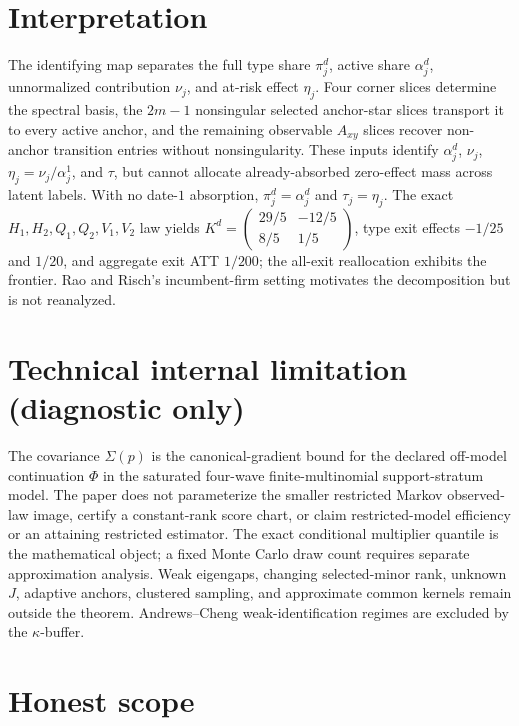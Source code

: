 \documentclass{article}
\begin{document}
\section{Interpretation}

The identifying map separates the full type share \(\pi_j^d\), active share \(\alpha_j^d\), unnormalized contribution \(\nu_j\), and at-risk effect \(\eta_j\).  Four corner slices determine the spectral basis, the \(2m-1\) nonsingular selected anchor-star slices transport it to every active anchor, and the remaining observable \(A_{xy}\) slices recover non-anchor transition entries without nonsingularity.  These inputs identify \(\alpha_j^d\), \(\nu_j\), \(\eta_j=\nu_j/\alpha_j^1\), and \(\tau\), but cannot allocate already-absorbed zero-effect mass across latent labels.  With no date-\(1\) absorption, \(\pi_j^d=\alpha_j^d\) and \(\tau_j=\eta_j\).  The exact \(H_1,H_2,Q_1,Q_2,V_1,V_2\) law yields \(K^d=\begin{pmatrix}29/5&-12/5\\8/5&1/5\end{pmatrix}\), type exit effects \(-1/25\) and \(1/20\), and aggregate exit ATT \(1/200\); the all-exit reallocation exhibits the frontier.  Rao and Risch's incumbent-firm setting motivates the decomposition but is not reanalyzed.

\section*{Technical internal limitation (diagnostic only)}

The covariance \(\Sigma(p)\) is the canonical-gradient bound for the declared off-model continuation \(\Phi\) in the saturated four-wave finite-multinomial support-stratum model.  The paper does not parameterize the smaller restricted Markov observed-law image, certify a constant-rank score chart, or claim restricted-model efficiency or an attaining restricted estimator.  The exact conditional multiplier quantile is the mathematical object; a fixed Monte Carlo draw count requires separate approximation analysis.  Weak eigengaps, changing selected-minor rank, unknown \(J\), adaptive anchors, clustered sampling, and approximate common kernels remain outside the theorem.  Andrews--Cheng weak-identification regimes are excluded by the \(\kappa\)-buffer.

\section{Honest scope}
\end{document}
